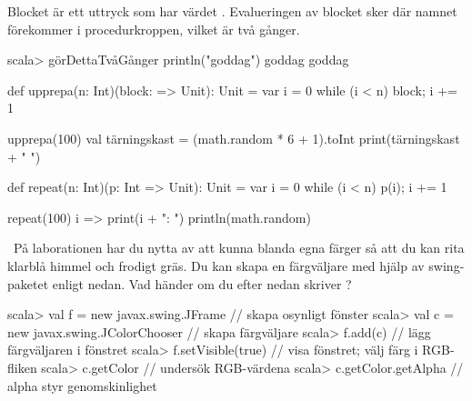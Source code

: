 \SOLUTION

\TaskSolved \what

\SubtaskSolved Blocket är ett uttryck som har värdet . Evalueringen av blocket sker där namnet  förekommer i procedurkroppen, vilket är två gånger.
\begin{REPL}
scala> görDettaTvåGånger { println("goddag") }
goddag
goddag
\end{REPL}

\SubtaskSolved
\begin{Code}
def upprepa(n: Int)(block: => Unit): Unit = {
   var i = 0
   while (i < n) {block; i += 1}
}
\end{Code}

\SubtaskSolved
\begin{Code}
upprepa(100){
  val tärningskast = (math.random * 6 + 1).toInt
  print(tärningskast + " ")
}
\end{Code}


\SubtaskSolved
\begin{Code}
def repeat(n: Int)(p: Int => Unit): Unit = {
   var i = 0
   while (i < n) {p(i); i += 1}
}
\end{Code}

\SubtaskSolved
\begin{Code}
repeat(100){ i =>
  print(i + ": ")
  println(math.random)
}
\end{Code}



\QUESTEND




\QUESTBEGIN

\Task\Uberkurs \what~På laborationen har du nytta av att kunna blanda egna färger så att du kan rita klarblå himmel och frodigt gräs. Du kan skapa en färgväljare med hjälp av swing-paketet enligt nedan. Vad händer om du efter nedan skriver ?

\begin{REPL}
scala> val f = new javax.swing.JFrame         // skapa osynligt fönster
scala> val c = new javax.swing.JColorChooser  // skapa färgväljare
scala> f.add(c)              // lägg färgväljaren i fönstret
scala> f.setVisible(true)    // visa fönstret; välj färg i RGB-fliken
scala> c.getColor            // undersök RGB-värdena
scala> c.getColor.getAlpha   // alpha styr genomskinlighet
\end{REPL}


\SOLUTION

